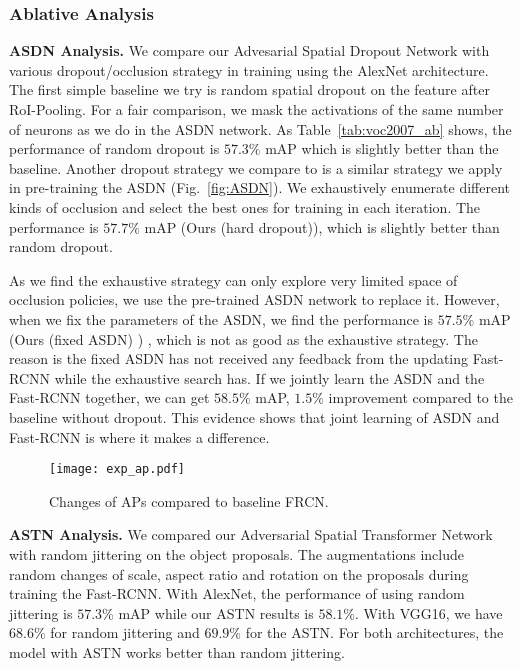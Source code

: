 \documentclass[10pt,twocolumn,letterpaper]{article}
\begin{document}
\subsubsection{Ablative Analysis} 
\vspace{-0.05in}
\textbf{ASDN Analysis.} We compare  our Advesarial Spatial Dropout Network with various dropout/occlusion strategy in training using the AlexNet architecture. The first simple baseline we try is random spatial dropout on the feature after RoI-Pooling. For a fair comparison, we mask the activations of the same number of neurons as we do in the ASDN network. As Table~\ref{tab:voc2007_ab} shows, the performance of random dropout is $57.3\%$ mAP which is slightly better than the baseline. Another dropout strategy we compare to is a similar strategy we apply in pre-training the ASDN (Fig.~\ref{fig:ASDN}). We exhaustively enumerate different kinds of occlusion and select the best ones for training in each iteration. The performance is $57.7\%$ mAP (Ours (hard dropout)), which is slightly better than random dropout. 

As we find the exhaustive strategy can only explore very limited space of occlusion policies, we use the pre-trained ASDN network to replace it. However, when we fix the parameters of the ASDN, we find the performance is $57.5\%$ mAP (Ours (fixed ASDN) ) , which is not as good as the exhaustive strategy. The reason is the fixed ASDN has not received any feedback from the updating Fast-RCNN while the exhaustive search has.  If we jointly learn the ASDN and the Fast-RCNN together, we can get $58.5\%$ mAP, $1.5\%$ improvement compared to the baseline without dropout. This evidence shows that joint learning of ASDN and Fast-RCNN is where it makes a difference. 

\begin{figure}
    \centering
    \texttt{[image: exp\_ap.pdf]}
    \vspace{-0.1in}
    \caption{Changes of APs compared to baseline FRCN.}\label{fig:exp_ap}
    \vspace{-0.1in}
\end{figure}
\textbf{ASTN Analysis.} We compared our Adversarial Spatial Transformer Network with random jittering on the object proposals. The augmentations include random changes of scale, aspect ratio and rotation on the proposals during training the Fast-RCNN. With AlexNet, the performance of using random jittering is $57.3\%$ mAP while our ASTN results is $58.1\%$. With VGG16, we have $68.6\%$ for random jittering and $69.9\%$ for the ASTN. For both architectures, the model with ASTN works better than random jittering. 
\end{document}
